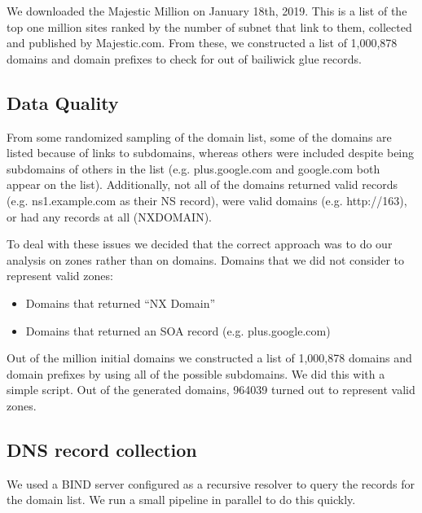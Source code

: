 \documentclass{idc_msc}
\begin{document}
We downloaded the Majestic Million\cite{MajesticMillion} on January 18th, 2019.
This is a list of the top one million sites ranked by the number of subnet that link to them, collected and published by Majestic.com.
From these, we constructed a list of 1,000,878 domains and domain prefixes to check for out of bailiwick glue records.

\subsection{Data Quality}

From some randomized sampling of the domain list, some of the domains are listed because of links to subdomains, whereas others were included despite being subdomains of others in the list (e.g. plus.google.com and google.com both appear on the list). Additionally, not all of the domains returned valid records (e.g. ns1.example.com as their NS record), were valid domains (e.g. http://163), or had any records at all (NXDOMAIN).

To deal with these issues we decided that the correct approach was to do our analysis on zones rather than on domains. Domains that we did not consider to represent valid zones:
\begin{itemize}
  \item Domains that returned “NX Domain”
  \item Domains that returned an SOA record (e.g. plus.google.com)
\end{itemize}

Out of the million initial domains we constructed a list of 1,000,878 domains and domain prefixes by using all of the possible subdomains. We did this with a simple script. Out of the generated domains, 964039 turned out to represent valid zones.

\subsection{DNS record collection}

We used a BIND server configured as a recursive resolver to query the records for the domain list.
We run a small pipeline in parallel\cite{Tange2011a} to do this quickly.

\end{document}
